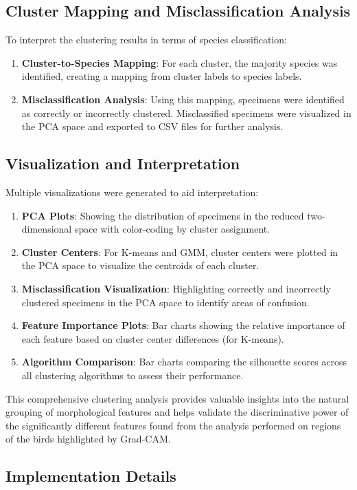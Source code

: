 \documentclass[a4paper,12pt]{report}
\begin{document}
\subsection{Cluster Mapping and Misclassification Analysis}
To interpret the clustering results in terms of species classification:
\begin{enumerate}
    \item \textbf{Cluster-to-Species Mapping}: For each cluster, the majority species was identified, creating a mapping from cluster labels to species labels.
    \item \textbf{Misclassification Analysis}: Using this mapping, specimens were identified as correctly or incorrectly clustered. Misclassified specimens were visualized in the PCA space and exported to CSV files for further analysis.
\end{enumerate}

\subsection{Visualization and Interpretation}
Multiple visualizations were generated to aid interpretation:
\begin{enumerate}
    \item \textbf{PCA Plots}: Showing the distribution of specimens in the reduced two-dimensional space with color-coding by cluster assignment.
    \item \textbf{Cluster Centers}: For K-means and GMM, cluster centers were plotted in the PCA space to visualize the centroids of each cluster.
    \item \textbf{Misclassification Visualization}: Highlighting correctly and incorrectly clustered specimens in the PCA space to identify areas of confusion.
    \item \textbf{Feature Importance Plots}: Bar charts showing the relative importance of each feature based on cluster center differences (for K-means).
    \item \textbf{Algorithm Comparison}: Bar charts comparing the silhouette scores across all clustering algorithms to assess their performance.
\end{enumerate}
This comprehensive clustering analysis provides valuable insights into the natural grouping of morphological features and helps validate the discriminative power of the significantly different features found from the analysis performed on regions of the birds highlighted by Grad-CAM. 

\subsection{Implementation Details}
\end{document}
